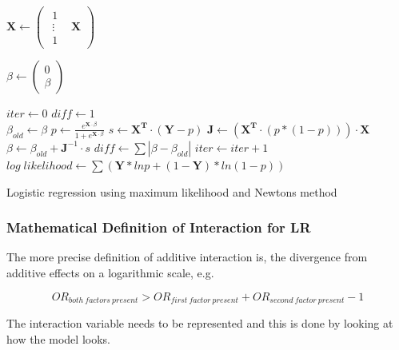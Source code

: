 \documentclass[10pt,a4paper]{report}
\newcounter{algorithmCode}
\begin{document}
\begin{algorithm}
\begin{algorithmic}
\State $\boldsymbol{X}\gets
\begin{pmatrix}
\begin{matrix}
  1\\
  \vdots\\
  1
\end{matrix} & \boldsymbol{X}
\end{pmatrix}
$

\State $\beta\gets
\begin{pmatrix}
  0\\
  \beta
\end{pmatrix}
$

\State $iter\gets 0$
\State $diff\gets 1$
\\
\State $\beta_{old}\gets\beta$
\State $p\gets \frac{e^{\boldsymbol{X} \cdot \beta}}{1+e^{\boldsymbol{X} \cdot \beta}}$
\State $s\gets \boldsymbol{X^T}\cdot (\boldsymbol{Y}-p)$
\State $\boldsymbol{J}\gets (\boldsymbol{X^T}\cdot (p*(1-p)))\cdot \boldsymbol{X}$
\State $\beta\gets \beta_{old}+\boldsymbol{J}^{-1} \cdot s$
\State $diff\gets \sum |\beta-\beta_{old}|$
\State $iter\gets iter+1$
\EndWhile
\State $log \; likelihood\gets \sum (\boldsymbol{Y}*ln p+(1-\boldsymbol{Y})*ln(1-p))$
\end{algorithmic}
  \caption{Logistic regression using maximum likelihood and Newtons method}
  \label{alg:lr}
\end{algorithm}

\subsubsection{Mathematical Definition of Interaction for LR}
\label{additive}
The more precise definition of additive interaction is, the divergence from additive effects on a logarithmic scale, e.g.

\begin{equation}
OR_{both\:factors\:present}>OR_{first\:factor\:present}+OR_{second\:factor\:present}-1
\end{equation}

\cite{rothman1998modern}

The interaction variable needs to be represented and this is done by looking at how the model looks.


\end{document}
